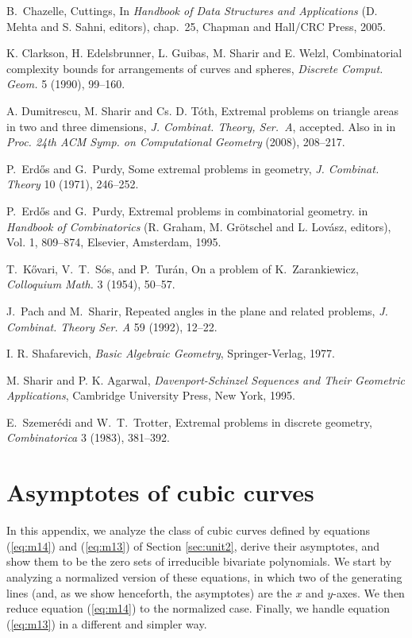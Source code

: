 \documentclass[12pt]{article}
\begin{document}
\begin{thebibliography}{99}

B.~Chazelle,
Cuttings,
In {\em Handbook of Data Structures and Applications}
(D. Mehta and S. Sahni, editors), chap.~25, Chapman and Hall/CRC Press, 2005.

K. Clarkson, H. Edelsbrunner, L. Guibas, M. Sharir and E. Welzl,
Combinatorial complexity bounds for arrangements of curves and
spheres,
{\it Discrete Comput. Geom.} 5 (1990), 99--160.

A. Dumitrescu, M. Sharir and Cs. D. T\'oth,
Extremal problems on triangle areas in two and three dimensions,
{\it J. Combinat. Theory, Ser.~A}, accepted. Also in
in {\it Proc. 24th ACM Symp. on Computational Geometry} (2008), 208--217.

P.~Erd\H{o}s and G.~Purdy,
Some extremal problems in geometry,
{\it J. Combinat. Theory} 10 (1971), 246--252.

P.~Erd\H os and G.~Purdy,
Extremal problems in combinatorial geometry.
in {\em Handbook of Combinatorics}
(R. Graham, M. Gr\"otschel and L. Lov\'asz, editors),
Vol. 1, 809--874, Elsevier, Amsterdam, 1995.

T.~K\H{o}vari, V.~T.~S\'os, and P.~Tur\'an,
On a problem of K.~Zarankiewicz,
{\it Colloquium Math.} 3 (1954), 50--57.

J.~Pach and M.~Sharir,
Repeated angles in the plane and related problems,
{\it J. Combinat. Theory Ser. A} 59 (1992), 12--22.

I. R. Shafarevich,
{\it Basic Algebraic Geometry},
Springer-Verlag, 1977.

M. Sharir and P. K. Agarwal,
{\it Davenport-Schinzel Sequences and Their Geometric Applications},
Cambridge University Press, New York, 1995.

E.~Szemer\'edi and W.~T.~Trotter,
Extremal problems in discrete geometry,
{\it Combinatorica} 3 (1983), 381--392.

\end{thebibliography}

\appendix

\section{Asymptotes of cubic curves}
In this appendix, we analyze the class of cubic curves defined by
equations (\ref{eq:m14}) and (\ref{eq:m13}) of Section
\ref{sec:unit2}, derive their asymptotes, and show them to be the
zero sets of irreducible bivariate polynomials.
We start by analyzing a normalized version
of these equations, in which two of the generating lines
(and, as we show henceforth, the asymptotes) are the $x$ and $y$-axes.
We then reduce equation (\ref{eq:m14}) to the normalized case.
Finally, we handle equation (\ref{eq:m13}) in a different and simpler
way.
\end{document}
